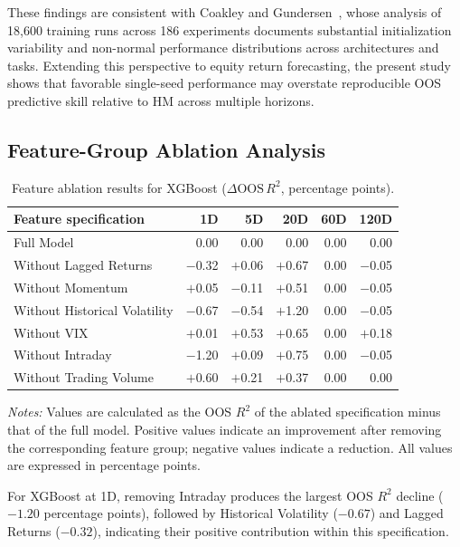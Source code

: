 \documentclass[runningheads,orivec]{llncs}
\begin{document}
These findings are consistent with Coakley and Gundersen~\cite{coakley2026}, whose analysis of 18,600 training runs across 186 experiments documents substantial initialization variability and non-normal performance distributions across architectures and tasks. Extending this perspective to equity return forecasting, the present study shows that favorable single-seed performance may overstate reproducible OOS predictive skill relative to HM across multiple horizons.

\subsection{Feature-Group Ablation Analysis}\label{subsec:ablation_study}

\begin{table}[htbp]
\centering
\caption{Feature ablation results for XGBoost ($\Delta \mathrm{OOS}\,R^2$, percentage points).}\label{tab:ablation_xgboost}
{\footnotesize
\setlength{\tabcolsep}{6pt}
\begin{tabular}{lrrrrr}
\hline
Feature specification & 1D & 5D & 20D & 60D & 120D \\
\hline
Full Model & 0.00 & 0.00 & 0.00 & 0.00 & 0.00 \\
Without Lagged Returns & $-$0.32 & $+$0.06 & $+$0.67 & 0.00 & $-$0.05 \\
Without Momentum & $+$0.05 & $-$0.11 & $+$0.51 & 0.00 & $-$0.05 \\
Without Historical Volatility & $-$0.67 & $-$0.54 & $+$1.20 & 0.00 & $-$0.05 \\
Without VIX & $+$0.01 & $+$0.53 & $+$0.65 & 0.00 & $+$0.18 \\
Without Intraday & $-$1.20 & $+$0.09 & $+$0.75 & 0.00 & $-$0.05 \\
Without Trading Volume & $+$0.60 & $+$0.21 & $+$0.37 & 0.00 & 0.00 \\
\hline
\end{tabular}
}
\par\vspace{4pt}\parbox{\linewidth}{\scriptsize\textit{Notes:} Values are calculated as the OOS $R^2$ of the ablated specification minus that of the full model. Positive values indicate an improvement after removing the corresponding feature group; negative values indicate a reduction. All values are expressed in percentage points.}
\end{table}

For XGBoost at 1D, removing Intraday produces the largest OOS $R^2$ decline ($-1.20$ percentage points), followed by Historical Volatility ($-0.67$) and Lagged Returns ($-0.32$), indicating their positive contribution within this specification.
\end{document}
